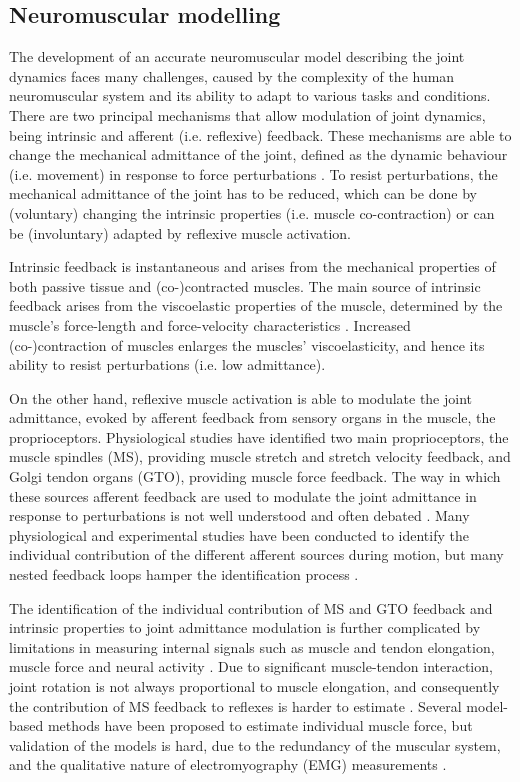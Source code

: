 \subsection*{Neuromuscular modelling}
The development of an accurate neuromuscular model describing the joint dynamics faces many challenges, caused by the complexity of the human neuromuscular system and its ability to adapt to various tasks and conditions. There are two principal mechanisms that allow modulation of joint dynamics, being intrinsic and afferent (i.e. reflexive) feedback. These mechanisms are able to change the mechanical admittance of the joint, defined as the dynamic behaviour (i.e. movement) in response to force perturbations \cite{schouten_nmclab_2008}. To resist perturbations, the mechanical admittance of the joint has to be reduced, which can be done by (voluntary) changing the intrinsic properties (i.e. muscle co-contraction) or can be (involuntary) adapted by reflexive muscle activation. 

Intrinsic feedback is instantaneous and arises from the mechanical properties of both passive tissue and (co-)contracted muscles. The main source of intrinsic feedback arises from the viscoelastic properties of the muscle, determined by the muscle’s force-length and force-velocity characteristics \cite{winter_biomechanics_1988}. Increased \mbox{(co-)contraction} of muscles enlarges the muscles' viscoelasticity, and hence its ability to resist perturbations (i.e. low admittance). 

On the other hand, reflexive muscle activation is able to modulate the joint admittance, evoked by afferent feedback from sensory organs in the muscle, the proprioceptors. Physiological studies have identified two main proprioceptors, the muscle spindles (MS), providing muscle stretch and stretch velocity feedback, and Golgi tendon organs (GTO), providing muscle force feedback. The way in which these sources afferent feedback are used to modulate the joint admittance in response to perturbations is not well understood and often debated \cite{loeb_hard_1987}. Many physiological and experimental studies have been conducted to identify the individual contribution of the different afferent sources during motion, but many nested feedback loops hamper the identification process \cite{schouten_nmclab_2008}. 

The identification of the individual contribution of MS and GTO feedback and intrinsic properties to joint admittance modulation is further complicated by limitations in measuring internal signals such as muscle and tendon elongation, muscle force and neural activity \cite{allen_why_2016}. Due to significant muscle-tendon interaction, joint rotation is not always proportional to muscle elongation, and consequently the contribution of MS feedback to reflexes is harder to estimate \cite{zajac_muscle_1989}. Several model-based methods have been proposed to estimate individual muscle force, but validation of the models is hard, due to the redundancy of the muscular system, and the qualitative nature of electromyography (EMG) measurements \cite{erdemir_model-based_2007}. 

